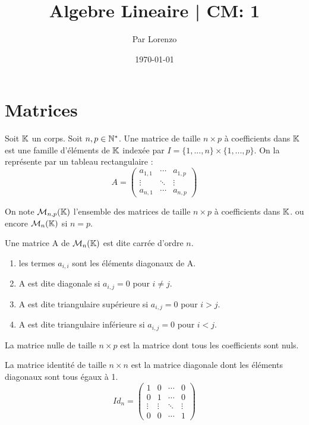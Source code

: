 \documentclass[a4paper, 12pt]{article}
\title{Algebre Lineaire | CM: 1}
\author{Par Lorenzo}
\date{\today}
\begin{document}
\maketitle

\section{Matrices}

\begin{definition}
    Soit $\mathbb{K}$ un corps. Soit $n, p \in \mathbb{N}^*$.
    Une matrice de taille $n \times p$ à coefficients dans $\mathbb{K}$ est une famille
    d'éléments de $\mathbb{K}$ indexée par $I = \{1, ..., n\} \times \{1, ..., p\}$.
    On la représente par un tableau rectangulaire :
    $$
        A = \begin{pmatrix}
            a_{1, 1} & \cdots & a_{1, p} \\
            \vdots & \ddots & \vdots \\
            a_{n, 1} & \cdots & a_{n, p}
        \end{pmatrix}
    $$
\end{definition}

\begin{definition}
    On note $\mathcal{M}_{n, p}(\mathbb{K})$ l'ensemble des matrices de taille $n \times p$ à coefficients dans $\mathbb{K}$.
    ou encore $\mathcal{M}_{n}(\mathbb{K})$ si $n = p$.
\end{definition}

\begin{definition}
    Une matrice A de $\mathcal{M}_{n}(\mathbb{K})$ est dite carrée d'ordre $n$.
    \begin{enumerate}
        \item les termes $a_{i, i}$ sont les éléments diagonaux de A.
        \item A est dite diagonale si $a_{i, j} = 0$ pour $i \neq j$.
        \item A est dite triangulaire supérieure si $a_{i, j} = 0$ pour $i > j$.
        \item A est dite triangulaire inférieure si $a_{i, j} = 0$ pour $i < j$.
    \end{enumerate}
\end{definition}

\begin{definition}
    La matrice nulle de taille $n \times p$ est la matrice dont tous les coefficients sont nuls.
\end{definition}

\begin{definition}
    La matrice identité de taille $n \times n$ est la matrice diagonale dont les éléments diagonaux sont tous égaux à 1.
    $$
        Id_n = \begin{pmatrix}
            1 & 0 & \cdots & 0 \\
            0 & 1 & \cdots & 0 \\
            \vdots & \vdots & \ddots & \vdots \\
            0 & 0 & \cdots & 1
        \end{pmatrix}
    $$
\end{definition}
\end{document}
